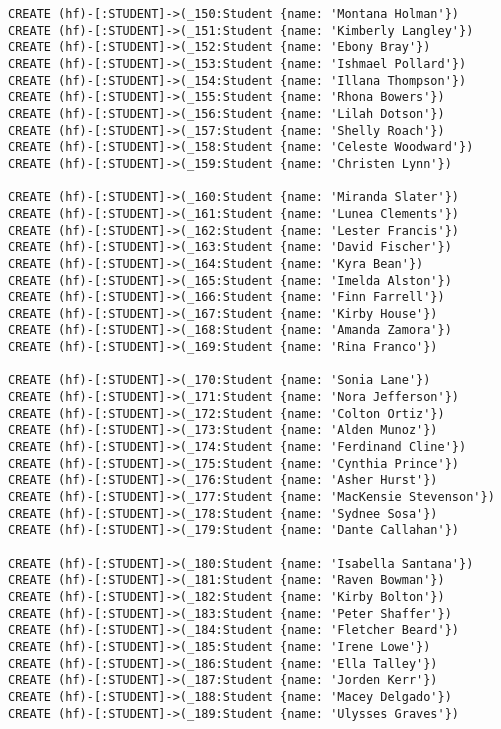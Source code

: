 \begin{lstlisting}
CREATE (hf)-[:STUDENT]->(_150:Student {name: 'Montana Holman'})
CREATE (hf)-[:STUDENT]->(_151:Student {name: 'Kimberly Langley'})
CREATE (hf)-[:STUDENT]->(_152:Student {name: 'Ebony Bray'})
CREATE (hf)-[:STUDENT]->(_153:Student {name: 'Ishmael Pollard'})
CREATE (hf)-[:STUDENT]->(_154:Student {name: 'Illana Thompson'})
CREATE (hf)-[:STUDENT]->(_155:Student {name: 'Rhona Bowers'})
CREATE (hf)-[:STUDENT]->(_156:Student {name: 'Lilah Dotson'})
CREATE (hf)-[:STUDENT]->(_157:Student {name: 'Shelly Roach'})
CREATE (hf)-[:STUDENT]->(_158:Student {name: 'Celeste Woodward'})
CREATE (hf)-[:STUDENT]->(_159:Student {name: 'Christen Lynn'})

CREATE (hf)-[:STUDENT]->(_160:Student {name: 'Miranda Slater'})
CREATE (hf)-[:STUDENT]->(_161:Student {name: 'Lunea Clements'})
CREATE (hf)-[:STUDENT]->(_162:Student {name: 'Lester Francis'})
CREATE (hf)-[:STUDENT]->(_163:Student {name: 'David Fischer'})
CREATE (hf)-[:STUDENT]->(_164:Student {name: 'Kyra Bean'})
CREATE (hf)-[:STUDENT]->(_165:Student {name: 'Imelda Alston'})
CREATE (hf)-[:STUDENT]->(_166:Student {name: 'Finn Farrell'})
CREATE (hf)-[:STUDENT]->(_167:Student {name: 'Kirby House'})
CREATE (hf)-[:STUDENT]->(_168:Student {name: 'Amanda Zamora'})
CREATE (hf)-[:STUDENT]->(_169:Student {name: 'Rina Franco'})

CREATE (hf)-[:STUDENT]->(_170:Student {name: 'Sonia Lane'})
CREATE (hf)-[:STUDENT]->(_171:Student {name: 'Nora Jefferson'})
CREATE (hf)-[:STUDENT]->(_172:Student {name: 'Colton Ortiz'})
CREATE (hf)-[:STUDENT]->(_173:Student {name: 'Alden Munoz'})
CREATE (hf)-[:STUDENT]->(_174:Student {name: 'Ferdinand Cline'})
CREATE (hf)-[:STUDENT]->(_175:Student {name: 'Cynthia Prince'})
CREATE (hf)-[:STUDENT]->(_176:Student {name: 'Asher Hurst'})
CREATE (hf)-[:STUDENT]->(_177:Student {name: 'MacKensie Stevenson'})
CREATE (hf)-[:STUDENT]->(_178:Student {name: 'Sydnee Sosa'})
CREATE (hf)-[:STUDENT]->(_179:Student {name: 'Dante Callahan'})

CREATE (hf)-[:STUDENT]->(_180:Student {name: 'Isabella Santana'})
CREATE (hf)-[:STUDENT]->(_181:Student {name: 'Raven Bowman'})
CREATE (hf)-[:STUDENT]->(_182:Student {name: 'Kirby Bolton'})
CREATE (hf)-[:STUDENT]->(_183:Student {name: 'Peter Shaffer'})
CREATE (hf)-[:STUDENT]->(_184:Student {name: 'Fletcher Beard'})
CREATE (hf)-[:STUDENT]->(_185:Student {name: 'Irene Lowe'})
CREATE (hf)-[:STUDENT]->(_186:Student {name: 'Ella Talley'})
CREATE (hf)-[:STUDENT]->(_187:Student {name: 'Jorden Kerr'})
CREATE (hf)-[:STUDENT]->(_188:Student {name: 'Macey Delgado'})
CREATE (hf)-[:STUDENT]->(_189:Student {name: 'Ulysses Graves'})


\end{lstlisting}
